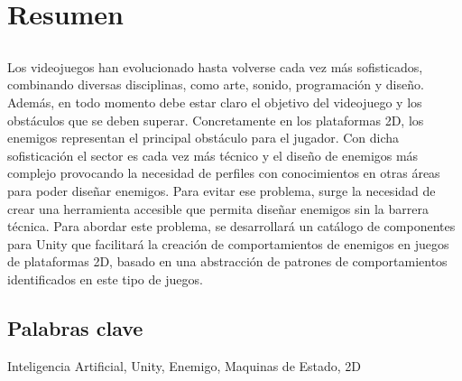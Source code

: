 \chapter*{Resumen}

\section*{\tituloPortadaVal}
Los videojuegos han evolucionado hasta volverse cada vez más sofisticados, combinando diversas disciplinas, como arte, sonido, programación y diseño. Además, en todo momento debe estar claro el objetivo del videojuego y los obstáculos que se deben superar. Concretamente en los plataformas 2D, los enemigos representan el principal obstáculo para el jugador. Con dicha sofisticación el sector es cada vez más técnico y el diseño de enemigos más complejo provocando la necesidad de perfiles con conocimientos en otras áreas para poder diseñar enemigos. Para evitar ese problema, surge la necesidad de crear una herramienta accesible que permita diseñar enemigos sin la barrera técnica. Para abordar este problema, se desarrollará un catálogo de componentes para Unity que facilitará la creación de comportamientos de enemigos en juegos de plataformas 2D, basado en una abstracción de patrones de comportamientos identificados en este tipo de juegos.
\section*{Palabras clave}
   
\noindent Inteligencia Artificial, Unity, Enemigo, Maquinas de Estado, 2D

   


